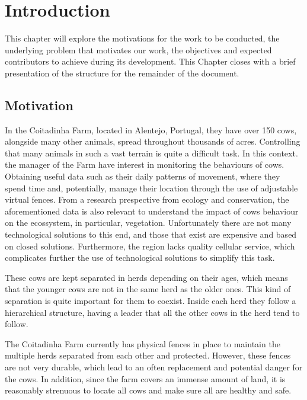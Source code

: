 
%

\chapter{Introduction}
\label{cha:introduction}
This chapter will explore the motivations for the work to be conducted, the underlying
problem that motivates our work, the objectives and expected contributors to achieve during
its development. This Chapter closes with a brief presentation of the structure for the
remainder of the document.

\section{Motivation}
\label{sec:motivation}
In the Coitadinha Farm, located in Alentejo, Portugal, they have over 150 cows,
alongside many other animals, spread throughout thousands of acres. Controlling that many
animals in such a vast terrain is quite a difficult task. In this context. the manager of the
Farm have interest in monitoring the behaviours of cows. Obtaining useful data such as their
daily patterns of movement, where they spend time and, potentially, manage their location
through the use of adjustable virtual fences. From a research prespective from ecology and
conservation, the aforementioned data is also relevant to understand the impact of cows
behaviour on the ecossystem, in particular, vegetation. Unfortunately there are not many
technological solutions to this end, and those that exist are expensive and based on
closed solutions. Furthermore, the region lacks quality cellular service, which complicates
further the use of technological solutions to simplify this task.

These cows are kept separated in herds depending on their ages, which means that the younger
cows are not in the same herd as the older ones. This kind of separation is quite important
for them to coexist. Inside each herd they follow a hierarchical structure, having a leader
that all the other cows in the herd tend to follow.

The Coitadinha Farm currently has physical fences in place to maintain the multiple
herds separated from each other and protected. However, these fences are not very durable,
which lead to an often replacement and potential danger for the cows. In addition, since the
farm covers an immense amount of land, it is reasonably strenuous to locate all cows and make
sure all are healthy and safe.

